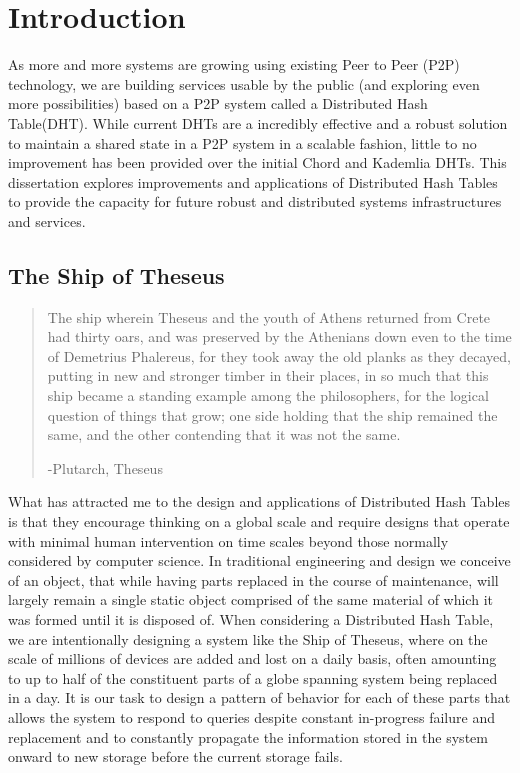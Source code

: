 





\chapter{Introduction}

As more and more systems are growing using existing Peer to Peer (P2P) technology, we are building services usable by the public (and exploring even more possibilities) based on a P2P system called a Distributed Hash Table(DHT).
While current DHTs are a incredibly effective and a robust solution to maintain a shared state in a P2P system in a scalable fashion, little to no improvement has been provided over the initial Chord\cite{chord} and Kademlia\cite{kademlia} DHTs.
This dissertation explores improvements and applications of Distributed Hash Tables to provide the capacity for future robust and distributed systems infrastructures and services.

\section{The Ship of Theseus}

\singlespacing
\blockquote{The ship wherein Theseus and the youth of Athens returned from Crete had thirty oars, and was preserved by the Athenians down even to the time of Demetrius Phalereus, for they took away the old planks as they decayed, putting in new and stronger timber in their places, in so much that this ship became a standing example among the philosophers, for the logical question of things that grow; one side holding that the ship remained the same, and the other contending that it was not the same.

-Plutarch, Theseus

}
\doublespacing

What has attracted me to the design and applications of Distributed Hash Tables is that they encourage thinking on a global scale and require designs that operate with minimal human intervention on time scales beyond those normally considered by computer science.
In traditional engineering and design we conceive of an object, that while having parts replaced in the course of maintenance, will largely remain a single static object comprised of the same material of which it was formed until it is disposed of.
When considering a Distributed Hash Table, we are intentionally designing a system like the Ship of Theseus, where on the scale of millions of devices are added and lost on a daily basis, often amounting to up to half of the constituent parts of a globe spanning system being replaced in a day.
It is our task to design a pattern of behavior for each of these parts that allows the system to respond to queries despite constant in-progress failure and replacement and to constantly propagate the information stored in the system onward to new storage before the current storage fails. 

